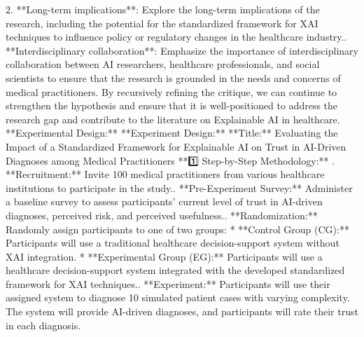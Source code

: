\documentclass{article}%
\begin{document}
2. **Long{-}term implications**: Explore the long{-}term implications of the research, including the potential for the standardized framework for XAI techniques to influence policy or regulatory changes in the healthcare industry.. **Interdisciplinary collaboration**: Emphasize the importance of interdisciplinary collaboration between AI researchers, healthcare professionals, and social scientists to ensure that the research is grounded in the needs and concerns of medical practitioners.\newline%
\newline%
By recursively refining the critique, we can continue to strengthen the hypothesis and ensure that it is well{-}positioned to address the research gap and contribute to the literature on Explainable AI in healthcare.  \newline%
\newline%
🔹 **Experimental Design:**  \newline%
**Experiment Design:**\newline%
\newline%
**Title:** Evaluating the Impact of a Standardized Framework for Explainable AI on Trust in AI{-}Driven Diagnoses among Medical Practitioners\newline%
\newline%
**1️⃣ Step{-}by{-}Step Methodology:**\newline%
. **Recruitment:** Invite 100 medical practitioners from various healthcare institutions to participate in the study.. **Pre{-}Experiment Survey:** Administer a baseline survey to assess participants' current level of trust in AI{-}driven diagnoses, perceived risk, and perceived usefulness.. **Randomization:** Randomly assign participants to one of two groups:\newline%
	* **Control Group (CG):** Participants will use a traditional healthcare decision{-}support system without XAI integration.\newline%
	* **Experimental Group (EG):** Participants will use a healthcare decision{-}support system integrated with the developed standardized framework for XAI techniques.. **Experiment:** Participants will use their assigned system to diagnose 10 simulated patient cases with varying complexity. The system will provide AI{-}driven diagnoses, and participants will rate their trust in each diagnosis.\newline%
\end{document}
